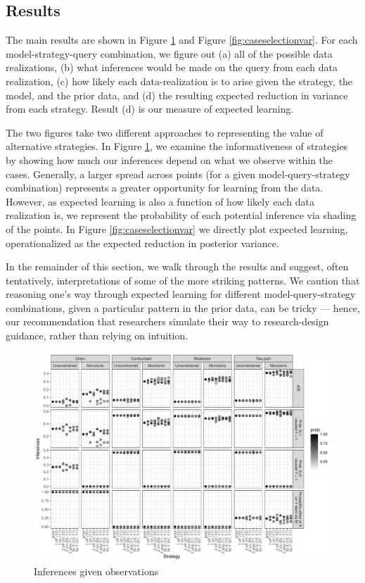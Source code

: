 \documentclass[
  12pt,
]{book}
\begin{document}
\hypertarget{results-1}{%
\subsection{Results}\label{results-1}}

The main results are shown in Figure \ref{fig:caseselectionest} and Figure \ref{fig:caseselectionvar}. For each model-strategy-query combination, we figure out (a) all of the possible data realizations, (b) what inferences would be made on the query from each data realization, (c) how likely each data-realization is to arise given the strategy, the model, and the prior data, and (d) the resulting expected reduction in variance from each strategy. Result (d) is our measure of expected learning.

The two figures take two different approaches to representing the value of alternative strategies. In Figure \ref{fig:caseselectionest}, we examine the informativeness of strategies by showing how much our inferences depend on what we observe within the cases. Generally, a larger spread across points (for a given model-query-strategy combination) represents a greater opportunity for learning from the data. However, as expected learning is also a function of how likely each data realization is, we represent the probability of each potential inference via shading of the points. In Figure \ref{fig:caseselectionvar} we directly plot expected learning, operationalized as the expected reduction in posterior variance.

In the remainder of this section, we walk through the results and suggest, often tentatively, interpretations of some of the more striking patterns. We caution that reasoning one's way through expected learning for different model-query-strategy combinations, given a particular pattern in the prior data, can be tricky --- hence, our recommendation that researchers simulate their way to research-design guidance, rather than relying on intuition.

\begin{figure}
\centering
\includegraphics{ii_files/figure-latex/caseselectionest-1.pdf}
\caption{\label{fig:caseselectionest}Inferences given observations}
\end{figure}
\end{document}
